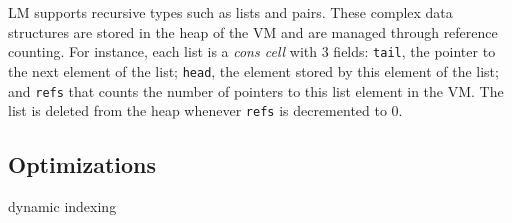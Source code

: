 LM supports recursive types such as lists and pairs. These complex data structures are stored in
the heap of the VM and are managed through reference counting. For instance, each list
is a \emph{cons cell} with 3 fields: \texttt{tail}, the pointer to the next element of the list;
\texttt{head}, the element stored by this element of the list; and \texttt{refs} that counts the
number of pointers to this list element in the VM. The list is deleted from the heap whenever
\texttt{refs} is decremented to 0.

\subsection{Optimizations}

dynamic indexing
